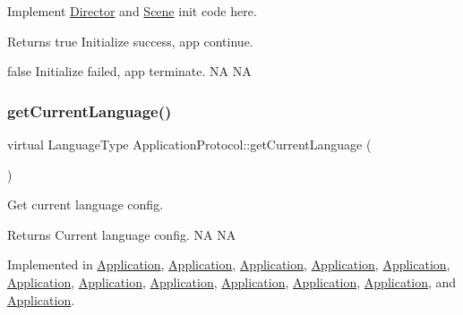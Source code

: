 Implement \hyperlink{classDirector}{Director} and \hyperlink{classScene}{Scene} init code here. 

\begin{DoxyReturn}{Returns}
true Initialize success, app continue. 

false Initialize failed, app terminate.  NA  NA 
\end{DoxyReturn}
\mbox{\label{classApplicationProtocol_a44034ed02f9dd0fc59264f74f9ef9b17}} 
\subsubsection{\texorpdfstring{get\+Current\+Language()}{getCurrentLanguage()}\hspace{0.1cm}{\footnotesize\ttfamily [1/2]}}
{\footnotesize\ttfamily virtual Language\+Type Application\+Protocol\+::get\+Current\+Language (\begin{DoxyParamCaption}{ }\end{DoxyParamCaption})\hspace{0.3cm}{\ttfamily [pure virtual]}}



Get current language config. 

\begin{DoxyReturn}{Returns}
Current language config.  NA  NA 
\end{DoxyReturn}


Implemented in \hyperlink{classApplication_ac972f15de44614b03604fb4e3e05cab3}{Application}, \hyperlink{classApplication_ac972f15de44614b03604fb4e3e05cab3}{Application}, \hyperlink{classApplication_ac972f15de44614b03604fb4e3e05cab3}{Application}, \hyperlink{classApplication_ac972f15de44614b03604fb4e3e05cab3}{Application}, \hyperlink{classApplication_ac972f15de44614b03604fb4e3e05cab3}{Application}, \hyperlink{classApplication_a78d257080c2dc2ff625bb4b5835667df}{Application}, \hyperlink{classApplication_ac972f15de44614b03604fb4e3e05cab3}{Application}, \hyperlink{classApplication_ac972f15de44614b03604fb4e3e05cab3}{Application}, \hyperlink{classApplication_a3fd3aeff0465fffe782af5b1441131c6}{Application}, \hyperlink{classApplication_a53107377c9d2531f171ba6f619aae78f}{Application}, \hyperlink{classApplication_a3fd3aeff0465fffe782af5b1441131c6}{Application}, and \hyperlink{classApplication_a3fd3aeff0465fffe782af5b1441131c6}{Application}.

